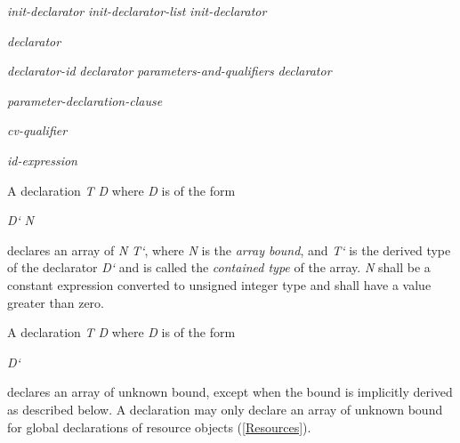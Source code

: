 \begin{grammar}
  \br
  \textit{init-declarator}\br
  \textit{init-declarator-list} \terminal{,} \textit{init-declarator}\br

  \br
  \textit{declarator} \br

  \br
  \textit{declarator-id} \br
  \textit{declarator} \textit{parameters-and-qualifiers}\br
  \textit{declarator} \terminal{[}  \terminal{]} \br

  \br
  \terminal{(} \textit{parameter-declaration-clause} \terminal{)}  \br

  \br
  \textit{cv-qualifier} \br

  \br
  \br

  \br
  \textit{id-expression}\br

\end{grammar}


\p A declaration \textit{T D} where \textit{D} is of the form

\begin{grammar}
\textit{D`} \terminal{[} \textit{N} \terminal{]} \br
\end{grammar}

declares an array of \textit{N} \textit{T`}, where \textit{N} is the
\textit{array bound}, and \textit{T`} is the derived type of the declarator
\textit{D`} and is called the \textit{contained type} of the array. \textit{N}
shall be a constant expression converted to unsigned integer type and shall have
a value greater than zero.

\p A declaration \textit{T D} where \textit{D} is of the form

\begin{grammar}
\textit{D`} \terminal{[} \terminal{]} \br
\end{grammar}

declares an array of unknown bound, except when the bound is implicitly derived
as described below. A declaration may only declare an array of unknown bound for
global declarations of resource objects (\ref{Resources}).

